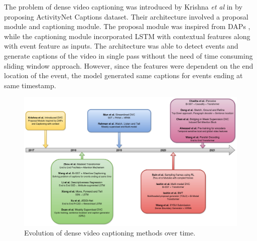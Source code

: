 \par The problem of dense video captioning was introduced by Krishna \textit{et al} in \cite{krishna2017densecaptioning} by proposing ActivityNet Captions dataset. Their architecture involved a proposal module and captioning module. The proposal module was inspired from DAPs \cite{Escorcia2016DAPsDA}, while the captioning module incorporated LSTM with contextual features along with event feature as inputs. The architecture was able to detect events and generate captions of the video in single pass without the need of time consuming sliding window approach.  However, since the features were dependent on the end location of the event, the model generated same captions for events ending at same timestamp.

\begin{figure}[h]
	\includegraphics[width=\linewidth]{assets/img/timeline.jpg}
	\caption{Evolution of dense video captioning methods over time.}
\end{figure}

